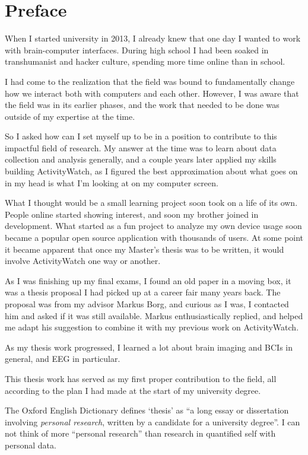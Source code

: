 \section*{Preface}

When I started university in 2013, I already knew that one day I wanted to work with brain-computer interfaces. During high school I had been soaked in transhumanist and hacker culture, spending more time online than in school.

I had come to the realization that the field was bound to fundamentally change how we interact both with computers and each other. However, I was aware that the field was in its earlier phases, and the work that needed to be done was outside of my expertise at the time.

So I asked how can I set myself up to be in a position to contribute to this impactful field of research. My answer at the time was to learn about data collection and analysis generally, and a couple years later applied my skills building ActivityWatch, as I figured the best approximation about what goes on in my head is what I'm looking at on my computer screen.

What I thought would be a small learning project soon took on a life of its own. People online started showing interest, and soon my brother joined in development. What started as a fun project to analyze my own device usage soon became a popular open source application with thousands of users. At some point it became apparent that once my Master's thesis was to be written, it would involve ActivityWatch one way or another.

As I was finishing up my final exams, I found an old paper in a moving box, it was a thesis proposal I had picked up at a career fair many years back. The proposal was from my advisor Markus Borg, and curious as I was, I contacted him and asked if it was still available. Markus enthusiastically replied, and helped me adapt his suggestion to combine it with my previous work on ActivityWatch.

As my thesis work progressed, I learned a lot about brain imaging and BCIs in general, and EEG in particular.

This thesis work has served as my first proper contribution to the field, all according to the plan I had made at the start of my university degree.

The Oxford English Dictionary defines `thesis' as ``a long essay or dissertation involving \emph{personal research}, written by a candidate for a university degree''. I can not think of more ``personal research'' than research in quantified self with personal data.
